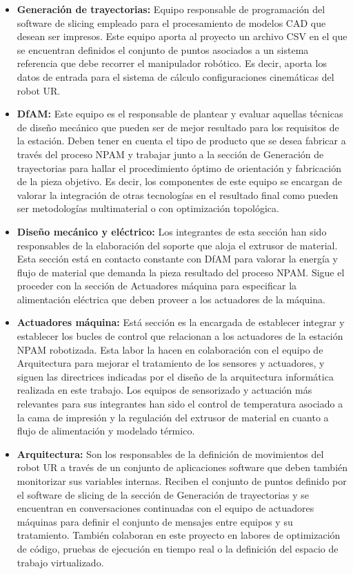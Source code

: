 \begin{itemize}
    \item \textbf{Generación de trayectorias:} Equipo responsable de programación del software de slicing empleado para el procesamiento de modelos \acrshort{CAD} que desean ser impresos. Este equipo aporta al proyecto un archivo CSV en el que se encuentran definidos el conjunto de puntos asociados a un sistema referencia que debe recorrer el manipulador robótico. Es decir, aporta los datos de entrada para el sistema de cálculo configuraciones cinemáticas del robot UR.
    \item \textbf{\acrshort{DfAM}:} Este equipo es el responsable de plantear y evaluar aquellas técnicas de diseño mecánico que pueden ser de mejor resultado para los requisitos de la estación. Deben tener en cuenta el tipo de producto que se desea fabricar a través del proceso \acrshort{NPAM} y trabajar junto a la sección de Generación de trayectorias para hallar el procedimiento óptimo de orientación y fabricación de la pieza objetivo. Es decir, los componentes de este equipo se encargan de valorar la integración de otras tecnologías en el resultado final como pueden ser metodologías multimaterial o con optimización topológica.
    \item \textbf{Diseño mecánico y eléctrico:} Los integrantes de esta sección han sido responsables de la elaboración del soporte que aloja el extrusor de material. Esta sección está en contacto constante con \acrshort{DfAM} para valorar la energía y flujo de material que demanda la pieza resultado del proceso \acrshort{NPAM}. Sigue el proceder con la sección de Actuadores máquina para especificar la alimentación eléctrica que deben proveer a los actuadores de la máquina.
    \item \textbf{Actuadores máquina:} Está sección es la encargada de establecer integrar y establecer los bucles de control que relacionan a los actuadores de la estación \acrshort{NPAM} robotizada. Esta labor la hacen en colaboración con el equipo de Arquitectura para mejorar el tratamiento de los sensores y actuadores, y siguen las directrices indicadas por el diseño de la arquitectura informática realizada en este trabajo. Los equipos de sensorizado y actuación más relevantes para sus integrantes han sido el control de temperatura asociado a la cama de impresión y la regulación del extrusor de material en cuanto a flujo de alimentación y modelado térmico.
    \item \textbf{Arquitectura:} Son los responsables de la definición de movimientos del robot UR a través de un conjunto de aplicaciones software que deben también monitorizar sus variables internas. Reciben el conjunto de puntos definido por el software de slicing de la sección de Generación de trayectorias y se encuentran en conversaciones continuadas con el equipo de actuadores máquinas para definir el conjunto de mensajes entre equipos y su tratamiento. También colaboran en este proyecto en labores de optimización de código, pruebas de ejecución en tiempo real o la definición del espacio de trabajo virtualizado.
\end{itemize}

